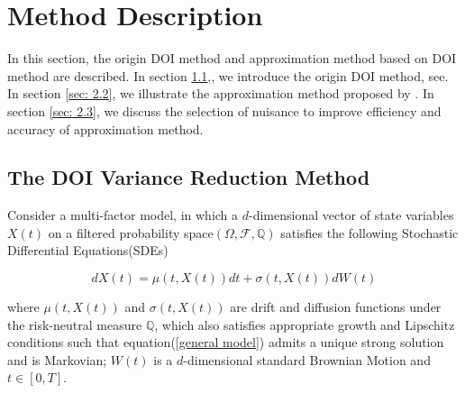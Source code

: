 \chapter{Method Description}\label{ch2}

In this section, the origin DOI method and approximation method based on DOI method are described. In section \ref{sec: 2.1},, we introduce the origin DOI method, see\cite{heath_monte_nodate}. In section \ref{sec: 2.2}, we illustrate the approximation method proposed by \cite{kristensen_adding_2011}. In section \ref{sec: 2.3}, we discuss the selection of nuisance to improve efficiency and accuracy of approximation method.

\section{The DOI Variance Reduction Method}
\label{sec: 2.1}

Consider a multi-factor model, in which a $d$-dimensional vector of state variables $X(t)$ on a filtered probability space$(\Omega,\mathcal F, \mathbb Q)$ satisfies the following Stochastic Differential Equations(SDEs)

\begin{equation}\label{general model}
    dX(t) = \mu(t, X(t)) dt + \sigma(t, X(t)) dW(t)
\end{equation}

\noindent where $\mu(t,X(t))$ and $\sigma(t, X(t))$ are drift and diffusion functions under the risk-neutral measure $\mathbb Q$, which also satisfies appropriate growth and Lipschitz conditions such that equation(\ref{general model}) admits a unique strong solution and is Markovian; $W(t)$ is a $d$-dimensional standard Brownian Motion and $t \in [0,T]$.





